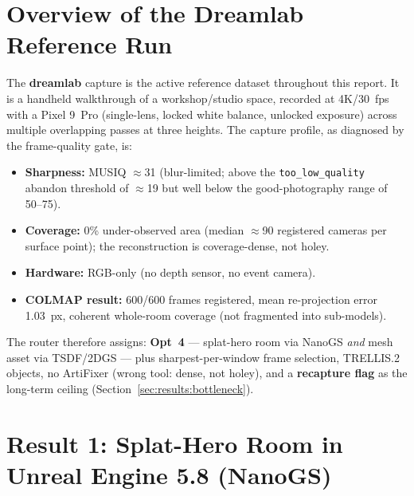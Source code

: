 %

\section{Overview of the Dreamlab Reference Run}
\label{sec:results:overall}

The \textbf{dreamlab} capture is the active reference dataset throughout this report.  It
is a handheld walkthrough of a workshop/studio space, recorded at 4K/30~fps with a Pixel
9~Pro (single-lens, locked white balance, unlocked exposure) across multiple overlapping
passes at three heights.  The capture profile, as diagnosed by the frame-quality gate, is:

\begin{itemize}
  \item \textbf{Sharpness:} MUSIQ $\approx$31 (blur-limited; above the \texttt{too\_low\_quality}
        abandon threshold of $\approx$19 but well below the good-photography range of 50--75).
  \item \textbf{Coverage:} 0\% under-observed area (median $\approx$90 registered cameras per
        surface point); the reconstruction is coverage-dense, not holey.
  \item \textbf{Hardware:} RGB-only (no depth sensor, no event camera).
  \item \textbf{COLMAP result:} 600/600 frames registered, mean re-projection error 1.03~px,
        coherent whole-room coverage (not fragmented into sub-models).
\end{itemize}

The router therefore assigns: \textbf{Opt~4} --- splat-hero room via NanoGS \emph{and} mesh
asset via TSDF/2DGS --- plus sharpest-per-window frame selection, TRELLIS.2 objects, no
ArtiFixer (wrong tool: dense, not holey), and a \textbf{recapture flag} as the long-term
ceiling (Section~\ref{sec:results:bottleneck}).

\section{Result 1: Splat-Hero Room in Unreal Engine 5.8 (NanoGS)}
\label{sec:results:nanogs}

